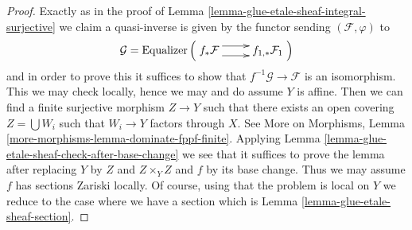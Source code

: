 \documentclass[10pt,a4paper]{amsart}
\theoremstyle{plain}
\theoremstyle{definition}
\theoremstyle{remark}
\numberwithin{equation}{subsection}
\begin{document}
\begin{proof}
Exactly as in the proof of
Lemma \ref{lemma-glue-etale-sheaf-integral-surjective}
we claim a quasi-inverse is given by the functor sending
$(\mathcal{F}, \varphi)$ to
$$
\mathcal{G} =
\text{Equalizer}\left(
\xymatrix{
f_*\mathcal{F}
\ar@<1ex>[r] \ar@<-1ex>[r] &
f_{1, *}\mathcal{F}_1
}
\right)
$$
and in order to prove this it suffices to show that
$f^{-1}\mathcal{G} \to \mathcal{F}$ is an isomorphism.
This we may check locally, hence we may and do assume $Y$
is affine. Then we can find a finite surjective morphism
$Z \to Y$ such that there exists an open covering
$Z = \bigcup W_i$ such that $W_i \to Y$ factors through $X$.
See
More on Morphisms, Lemma \ref{more-morphisms-lemma-dominate-fppf-finite}.
Applying Lemma
\ref{lemma-glue-etale-sheaf-check-after-base-change}
we see that it suffices to prove
the lemma after replacing $Y$ by $Z$ and $Z \times_Y Z$ and $f$
by its base change. Thus we may assume $f$ has sections Zariski locally.
Of course, using that the problem is local on $Y$ we reduce
to the case where we have a section which is
Lemma \ref{lemma-glue-etale-sheaf-section}.
\end{proof}
\end{document}
